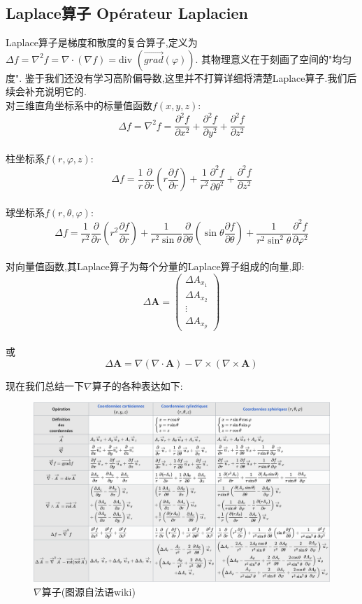 \documentclass[12pt, a4paper, oneside]{ctexbook}
\begin{document}
    \subsection{Laplace算子 Opérateur Laplacien}
    Laplace算子是梯度和散度的复合算子,定义为$\Delta f=\nabla^2 f=\nabla\cdot(\nabla f)=\text{div }(\overrightarrow{grad} (\varphi))$.
    其物理意义在于刻画了空间的"均匀度".
    鉴于我们还没有学习高阶偏导数,这里并不打算详细将清楚Laplace算子.我们后续会补充说明它的.\\

    对三维直角坐标系中的标量值函数$f(x,y,z)$:
    $$
    \Delta f=\nabla^{2}f=\frac{\partial^{2}f}{\partial x^{2}}+\frac{\partial^{2}f}{\partial y^{2}}+\frac{\partial^{2}f}{\partial z^{2}}
    $$\\

    柱坐标系$f(r,\varphi,z)$:
    $$
    \Delta f=\frac{1}{r} \frac{\partial}{\partial r}\left(r \frac{\partial f}{\partial r}\right)+\frac{1}{r^{2}} \frac{\partial^{2} f}{\partial \theta^{2}}+\frac{\partial^{2} f}{\partial z^{2}}
    $$\\

    球坐标系$f(r,\theta,\varphi)$:
    $$
      \Delta f=\frac{1}{r^2} \frac{\partial}{\partial r}\left(r^2 \frac{\partial f}{\partial r}\right)
      +\frac{1}{r^2\sin\theta}\frac{\partial}{\partial\theta}(\sin\theta\frac{\partial f}{\partial\theta})
      +\frac{1}{r^2\sin^2\theta}\frac{\partial^2f}{\partial\varphi^2}
    $$\\

    对向量值函数,其Laplace算子为每个分量的Laplace算子组成的向量,即:
    $$
    \Delta \textbf{A}=
    \begin{pmatrix}
      \Delta A_{x_1}\\
      \Delta A_{x_2}\\
      \vdots \\
      \Delta A_{x_p}
    \end{pmatrix}
    $$\\

    或
    $$
    \Delta \textbf{A}=\nabla(\nabla\cdot\textbf{A})-\nabla\times(\nabla\times\textbf{A})
    $$

    现在我们总结一下$\nabla$算子的各种表达如下:
    \begin{figure}[!h]
      \centering
      \includegraphics[scale=0.4]{nabla.png}
      \caption{$\nabla$算子(图源自法语wiki)}
      \label{fig:nabla}
    \end{figure}
\end{document}
